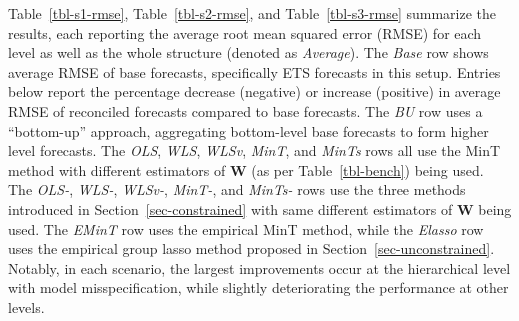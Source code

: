 \documentclass[
  11pt]{article}
\theoremstyle{plain}
\theoremstyle{remark}
\begin{document}
Table~\ref{tbl-s1-rmse}, Table~\ref{tbl-s2-rmse}, and
Table~\ref{tbl-s3-rmse} summarize the results, each reporting the
average root mean squared error (RMSE) for each level as well as the
whole structure (denoted as \emph{Average}). The \emph{Base} row shows
average RMSE of base forecasts, specifically ETS forecasts in this
setup. Entries below report the percentage decrease (negative) or
increase (positive) in average RMSE of reconciled forecasts compared to
base forecasts. The \emph{BU} row uses a ``bottom-up'' approach,
aggregating bottom-level base forecasts to form higher level forecasts.
The \emph{OLS}, \emph{WLS}, \emph{WLSv}, \emph{MinT}, and \emph{MinTs}
rows all use the MinT method with different estimators of \(\bm{W}\) (as
per Table~\ref{tbl-bench}) being used. The \emph{OLS-}, \emph{WLS-},
\emph{WLSv-}, \emph{MinT-}, and \emph{MinTs-} rows use the three methods
introduced in Section~\ref{sec-constrained} with same different
estimators of \(\bm{W}\) being used. The \emph{EMinT} row uses the
empirical MinT method, while the \emph{Elasso} row uses the empirical
group lasso method proposed in Section~\ref{sec-unconstrained}. Notably,
in each scenario, the largest improvements occur at the hierarchical
level with model misspecification, while slightly deteriorating the
performance at other levels.
\end{document}
